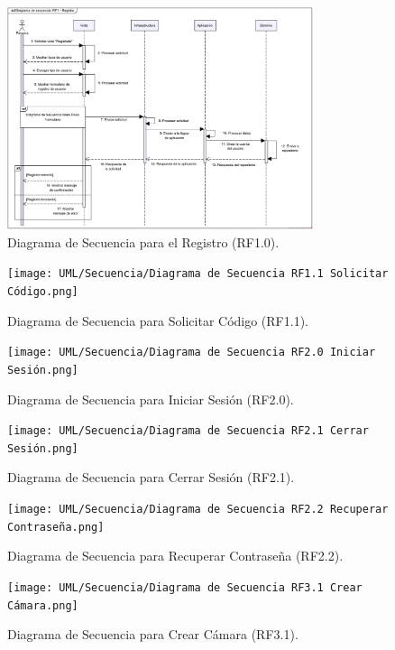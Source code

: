 \begin{figure}[H]
    \centering
    \caption{Diagrama de Secuencia para el Registro (RF1.0).}
 \includegraphics[width=0.8\textwidth]{UML/Secuencia/Diagrama de Secuencia RF1.0 Registro.png}
\end{figure}


\begin{figure}[H]
    \centering
    \caption{Diagrama de Secuencia para Solicitar Código (RF1.1).}
    \texttt{[image: UML/Secuencia/Diagrama de Secuencia RF1.1 Solicitar Código.png]}
\end{figure}


\begin{figure}[H]
	\centering
	\caption{Diagrama de Secuencia para Iniciar Sesión (RF2.0).}
	\texttt{[image: UML/Secuencia/Diagrama de Secuencia RF2.0 Iniciar Sesión.png]}
\end{figure}


\begin{figure}[H]
	\centering
	\caption{Diagrama de Secuencia para Cerrar Sesión (RF2.1).}
 \texttt{[image: UML/Secuencia/Diagrama de Secuencia RF2.1 Cerrar Sesión.png]}
\end{figure}


\begin{figure}[H]
	\centering
		\caption{Diagrama de Secuencia para Recuperar Contraseña (RF2.2).}
	\texttt{[image: UML/Secuencia/Diagrama de Secuencia RF2.2 Recuperar Contraseña.png]}
\end{figure}


\begin{figure}[H]
	\centering
		\caption{Diagrama de Secuencia para Crear Cámara (RF3.1).}
	\texttt{[image: UML/Secuencia/Diagrama de Secuencia RF3.1 Crear Cámara.png]}
\end{figure}


